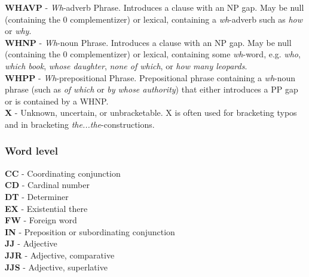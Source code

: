 \textbf{WHAVP} - \textit{Wh}-adverb Phrase.  Introduces a clause with an NP gap.  May be null (containing the 0 complementizer)  
or lexical, containing a \textit{wh}-adverb such as \textit{how} or \textit{why}.\\



\textbf{WHNP} - \textit{Wh}-noun Phrase.  Introduces a clause with an NP gap.  May be null (containing the 0 complementizer) or  
lexical, containing some \textit{wh}-word, e.g. \textit{who}, \textit{which book}, \textit{whose daughter}, \textit{none of which},  
or \textit{how many leopards}.\\



\textbf{WHPP} - \textit{Wh}-prepositional Phrase.  Prepositional phrase containing a \textit{wh}-noun phrase (such as  
\textit{of which} or \textit{by whose authority}) that either introduces a PP gap or is contained by a WHNP.\\



\textbf{X} - Unknown, uncertain, or unbracketable.  X is often used for bracketing typos and in bracketing  
\textit{the...the}-constructions.\\



\subsubsection*{Word level}


\textbf{CC}   - Coordinating conjunction\\


\textbf{CD}   - Cardinal number\\


\textbf{DT}   - Determiner\\


\textbf{EX}   - Existential there\\


\textbf{FW}   - Foreign word\\


\textbf{IN}   - Preposition or subordinating conjunction\\


\textbf{JJ}   - Adjective\\


\textbf{JJR}  - Adjective, comparative\\


\textbf{JJS}  - Adjective, superlative\\


